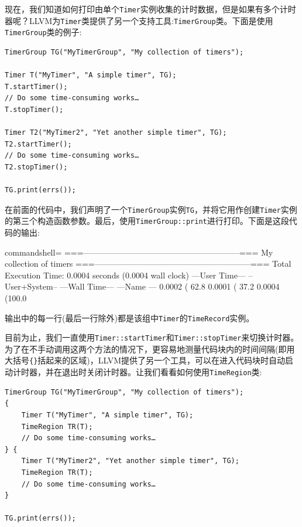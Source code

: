 现在，我们知道如何打印由单个\texttt{Timer}实例收集的计时数据，但是如果有多个计时器呢？LLVM为\texttt{Timer}类提供了另一个支持工具:\texttt{TimerGroup}类。下面是使用\texttt{TimerGroup}类的例子:

\begin{lstlisting}[style=styleCXX]
TimerGroup TG("MyTimerGroup", "My collection of timers");

Timer T("MyTimer", "A simple timer", TG);
T.startTimer();
// Do some time-consuming works…
T.stopTimer();

Timer T2("MyTimer2", "Yet another simple timer", TG);
T2.startTimer();
// Do some time-consuming works…
T2.stopTimer();

TG.print(errs());
\end{lstlisting}

在前面的代码中，我们声明了一个\texttt{TimerGroup}实例\texttt{TG}，并将它用作创建\texttt{Timer}实例的第三个构造函数参数。最后，使用\texttt{TimerGroup::print}进行打印。下面是这段代码的输出:

\begin{tcblisting}{commandshell={}}
===---------------------------------------------------------===
                    My collection of timers
===---------------------------------------------------------===
Total Execution Time: 0.0004 seconds (0.0004 wall clock)
  ---User Time--- --User+System-- ---Wall Time--- ---Name ---
  0.0002 ( 62.8%
  0.0001 ( 37.2%
  0.0004 (100.0%
\end{tcblisting}

输出中的每一行(最后一行除外)都是该组中\texttt{Timer}的\texttt{TimeRecord}实例。

目前为止，我们一直使用\texttt{Timer::startTimer}和\texttt{Timer::stopTimer}来切换计时器。为了在不手动调用这两个方法的情况下，更容易地测量代码块内的时间间隔(即用大括号\texttt{\{\}}括起来的区域)，LLVM提供了另一个工具，可以在进入代码块时自动启动计时器，并在退出时关闭计时器。让我们看看如何使用\texttt{TimeRegion}类:

\begin{lstlisting}[style=styleCXX]
TimerGroup TG("MyTimerGroup", "My collection of timers");
{
	Timer T("MyTimer", "A simple timer", TG);
	TimeRegion TR(T);
	// Do some time-consuming works…
} {
	Timer T("MyTimer2", "Yet another simple timer", TG);
	TimeRegion TR(T);
	// Do some time-consuming works…
}

TG.print(errs());
\end{lstlisting}


